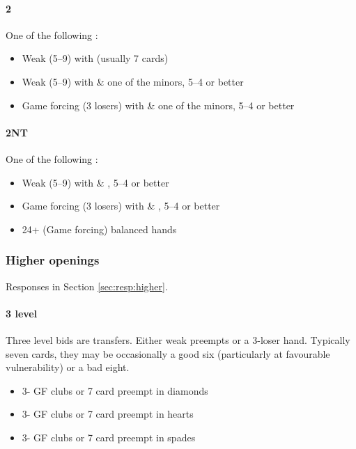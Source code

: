 \paragraph{2\spades}
One of the following :
\begin{itemize}
\item Weak (5--9) with \clubs (usually 7 cards)
\item Weak (5--9) with \hearts \& one of the minors, 5--4 or better
\item Game forcing (3 losers) with \hearts \& one of the minors, 5--4 or better 
\end{itemize}

\paragraph{2NT}
One of the following :
\begin{itemize}
\item Weak (5--9) with \spades \& \diamonds, 5--4 or better
\item Game forcing (3 losers) with \spades \& \diamonds, 5--4 or better
\item 24+ (Game forcing) balanced hands
\end{itemize}

\subsubsection{Higher openings}
\label{sec:open:higher}

Responses in Section \ref{sec:resp:higher}.

\paragraph{3 level}

Three level bids are transfers. Either weak preempts or a 3-loser hand.
Typically seven cards, they may be occasionally a good six (particularly at
favourable vulnerability) or a bad eight.

\begin{itemize}
\item 3\clubs - GF clubs or 7 card preempt in diamonds 
\item 3\diamonds - GF clubs or 7 card preempt in hearts 
\item 3\hearts - GF clubs or 7 card preempt in spades 
\end{itemize}

